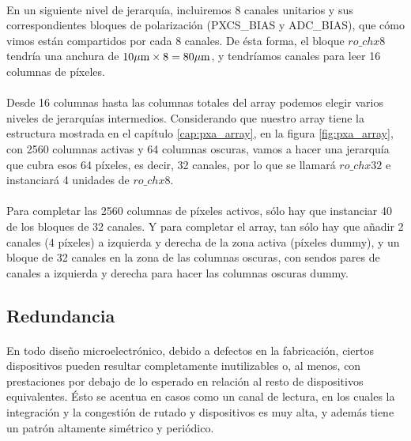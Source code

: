 \paragraph{}
En un siguiente nivel de jerarquía, incluiremos 8 canales unitarios y sus
correspondientes bloques de polarización (PXCS\_BIAS y ADC\_BIAS), que cómo vimos
están compartidos por cada 8 canales. De ésta forma, el bloque $ro\_chx8$
tendría una anchura de $10\mu\text{m} \times 8 = 80\mu\text{m}$, y tendríamos canales para
leer 16 columnas de píxeles.

\paragraph{}
Desde 16 columnas hasta las columnas totales del array podemos elegir varios niveles
de jerarquías intermedios. Considerando que nuestro array tiene la estructura
mostrada en el capítulo \ref{cap:pxa_array}, en la figura \ref{fig:pxa_array},
con 2560 columnas activas y 64 columnas oscuras, vamos a hacer una jerarquía que
cubra esos 64 píxeles, es decir, 32 canales, por lo que se llamará $ro\_chx32$ e
instanciará 4 unidades de $ro\_chx8$.

\paragraph{}
Para completar las 2560 columnas de píxeles activos, sólo hay que instanciar 40
de los bloques de 32 canales. Y para completar el array, tan sólo hay que añadir
2 canales (4 píxeles) a izquierda y derecha de la zona activa (píxeles dummy), y
un bloque de 32 canales en la zona de las columnas oscuras, con sendos pares de
canales a izquierda y derecha para hacer las columnas oscuras dummy.

\subsection{Redundancia}

\paragraph{}
En todo diseño microelectrónico, debido a defectos en la fabricación, ciertos
dispositivos pueden resultar completamente inutilizables o, al menos, con prestaciones
por debajo de lo esperado en relación al resto de dispositivos equivalentes.
Ésto se acentua en casos como un canal de lectura, en los cuales la integración
y la congestión de rutado y dispositivos es muy alta, y además tiene un patrón
altamente simétrico y periódico.

